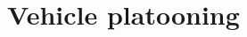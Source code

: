 \documentclass[10pt]{beamer}
\begin{document}






\section{Vehicle platooning}































\end{document}
